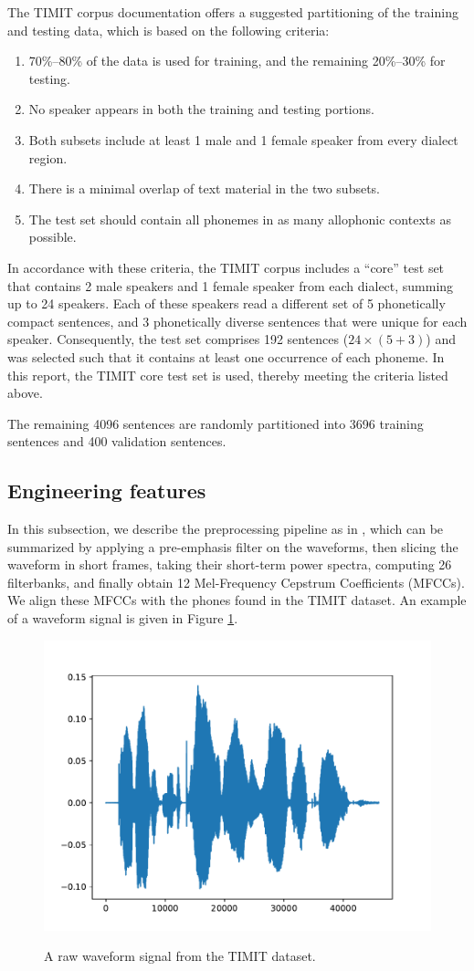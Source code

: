 		The TIMIT corpus documentation offers a suggested partitioning of the training and testing data, which is based on the following criteria:
		\begin{enumerate}
			\item 70\%--80\% of the data is used for training, and the remaining 20\%--30\% for testing.
			\item No speaker appears in both the training and testing portions.
			\item Both subsets include at least 1 male and 1 female speaker from every dialect region.
			\item There is a minimal overlap of text material in the two subsets.
			\item The test set should contain all phonemes in as many allophonic contexts as possible.
		\end{enumerate}
		In accordance with these criteria, the TIMIT corpus includes a ``core'' test set that contains 2 male speakers and 1 female speaker from each dialect, summing up to 24 speakers.
		Each of these speakers read a different set of 5 phonetically compact sentences, and 3 phonetically diverse sentences that were unique for each speaker.
		Consequently, the test set comprises 192 sentences ($24\times(5+3)$) and was selected such that it contains at least one occurrence of each phoneme.
		In this report, the TIMIT core test set is used, thereby meeting the criteria listed above.

		The remaining 4096 sentences are randomly partitioned into 3696 training sentences and 400 validation sentences.

	\subsection{Engineering features}

		In this subsection, we describe the preprocessing pipeline as in \cite{fayek2016}, which can be summarized by applying a pre-emphasis filter on the waveforms, then slicing the waveform in short frames, taking their short-term power spectra, computing 26 filterbanks, and finally obtain 12 Mel-Frequency Cepstrum Coefficients (MFCCs).
		We align these MFCCs with the phones found in the TIMIT dataset.
		An example of a waveform signal is given in Figure \ref{fig:signal}.
			\begin{figure}[ht]
				\centering
			    \includegraphics[width=.45\linewidth]{gfx/signal}
			    \label{fig:signal}
			    \caption{A raw waveform signal from the TIMIT dataset.}
			\end{figure}

